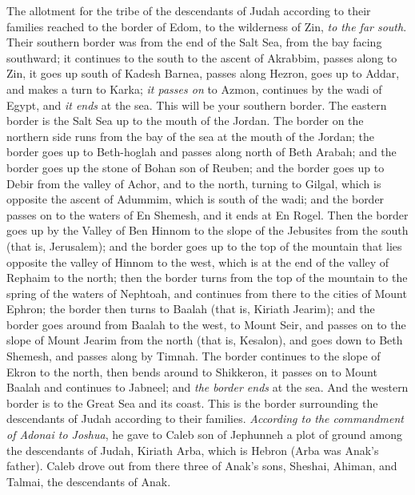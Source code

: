 \begin{biblechapter} %
 The allotment for the tribe of the descendants of Judah according to their families reached to the border of Edom, to the wilderness of Zin, \textit{to the far south}.
\verse Their southern border was from the end of the Salt Sea, from the bay facing southward;
\verse it continues to the south to the ascent of Akrabbim, passes along to Zin, it goes up south of Kadesh Barnea, passes along Hezron, goes up to Addar, and makes a turn to Karka;
\verse \textit{it passes on} to Azmon, continues by the wadi of Egypt, and \textit{it ends} at the sea. This will be your southern border.
\verse The eastern border is the Salt Sea up to the mouth of the Jordan. The border on the northern side runs from the bay of the sea at the mouth of the Jordan;
\verse the border goes up to Beth-hoglah and passes along north of Beth Arabah; and the border goes up the stone of Bohan son of Reuben;
\verse and the border goes up to Debir from the valley of Achor, and to the north, turning to Gilgal, which is opposite the ascent of Adummim, which is south of the wadi; and the border passes on to the waters of En Shemesh, and it ends at En Rogel.
\verse Then the border goes up by the Valley of Ben Hinnom to the slope of the Jebusites from the south (that is, Jerusalem); and the border goes up to the top of the mountain that lies opposite the valley of Hinnom to the west, which is at the end of the valley of Rephaim to the north;
\verse then the border turns from the top of the mountain to the spring of the waters of Nephtoah, and continues from there to the cities of Mount Ephron; the border then turns to Baalah (that is, Kiriath Jearim);
\verse and the border goes around from Baalah to the west, to Mount Seir, and passes on to the slope of Mount Jearim from the north (that is, Kesalon), and goes down to Beth Shemesh, and passes along by Timnah.
\verse The border continues to the slope of Ekron to the north, then bends around to Shikkeron, it passes on to Mount Baalah and continues to Jabneel; and \textit{the border ends} at the sea.
\verse And the western border is to the Great Sea and its coast. This is the border surrounding the descendants of Judah according to their families.
\verse \textit{According to the commandment of Adonai to Joshua}, he gave to Caleb son of Jephunneh a plot of ground among the descendants of Judah, Kiriath Arba, which is Hebron (Arba was Anak’s father).
\verse Caleb drove out from there three of Anak’s sons, Sheshai, Ahiman, and Talmai, the descendants of Anak.

\end{biblechapter}

